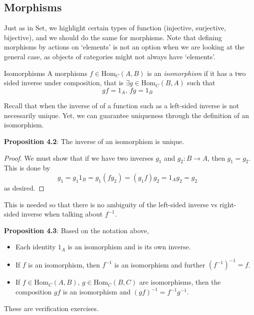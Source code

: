 \documentclass{report}
\begin{document}
\newpage
\begin{topic}
    \section{Morphisms}
\end{topic}

Just as in $\text{Set}$, we highlight certain types of function (injective, surjective, bijective), and we should do the same for morphisms. Note that defining morphisms by actions on `elements' is not an option when we are looking at the general case, as objects of categories might not always have `elements'.

\begin{definition}[\label{def:1.4.1}]{Isomorphisms}
    A morphisms $f \in \text{Hom}_{C}(A, B)$ is an \textit{isomorphism} if it has a two sided inverse under composition, that is $\exists g \in \text{Hom}_{C}(B, A)$ such that
    \begin{equation*}
        gf = 1_{A}, \, fg = 1_{B}
    \end{equation*}
\end{definition}

Recall that when the inverse of of a function such as a left-sided inverse is not necessarily unique. Yet, we can guarantee uniqueness through the definition of an isomorphism. 

\textbf{Proposition 4.2}: The inverse of an isomorphism is unique.
    \begin{proof}
        We must show that if we have two inverses $g_{1}$ and $g_{2} : B \rightarrow A$, then $g_{1} = g_{2}$. This is done by 
        \begin{equation*}
            g_{1} = g_{1}1_{B} = g_{1}(fg_{2}) = (g_{1}f)g_{2} = 1_{A}g_{2} = g_{2}
        \end{equation*}
        as desired.
    \end{proof}
This is needed so that there is no ambiguity of the left-sided inverse vs right-sided inverse when talking about $f^{-1}$.

\textbf{Proposition 4.3}: Based on the notation above,
    \begin{itemize}
        \item Each identity $1_{A}$ is an isomorphism and is its own inverse.

        \item If $f$ is an isomorphism, then $f^{-1}$ is an isomorphism and further $(f^{-1})^{-1} = f$.

        \item If $f \in \text{Hom}_{C}(A, B)$, $g \in \text{Hom}_{C}(B, C)$ are isomorphisms, then the composition $gf$ is an isomorphism and $(gf)^{-1} = f^{-1}g^{-1}$.
    \end{itemize}
These are verification exercises.
\end{document}
